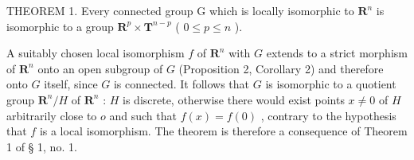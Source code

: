 THEOREM 1. Every connected group G which is locally isomorphic to \(\mathbf{R}^n\) is isomorphic to a group \(\mathbf{R}^p \times \mathbf{T}^{n-p}\) ( \(0 \leqslant p \leqslant n\) ).

A suitably chosen local isomorphism \(f\) of \(\mathbf{R}^n\) with \(G\) extends to a strict morphism of \(\mathbf{R}^n\) onto an open subgroup of \(G\) (Proposition 2, Corollary 2) and therefore onto \(G\) itself, since \(G\) is connected. It follows that \(G\) is isomorphic to a quotient group \(\mathbf{R}^n / H\) of \(\mathbf{R}^n\) : \(H\) is discrete, otherwise there would exist points \(x \neq 0\) of \(H\) arbitrarily close to \(o\) and such that \(f(x) = f(0)\) , contrary to the hypothesis that \(f\) is a local isomorphism. The theorem is therefore a consequence of Theorem 1 of § 1, no. 1.

